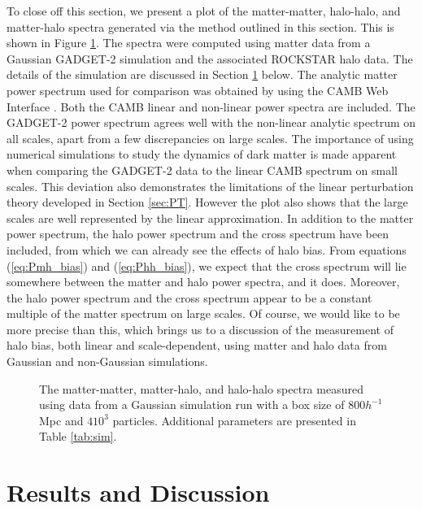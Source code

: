 \documentclass[10pt,letterpaper,final]{iopart}
\numberwithin{equation}{subsection}
\begin{document}
 
To close off this section, we present a plot of the matter-matter, halo-halo, and matter-halo spectra generated via the method outlined in this section. This is shown in Figure \ref{PSplot}. The spectra were computed using matter data from a Gaussian GADGET-2 simulation and the associated ROCKSTAR halo data. The details of the simulation are discussed in Section \ref{sec:results} below. The analytic matter power spectrum used for comparison was obtained by using the CAMB Web Interface \cite{CAMBweb}\cite{CAMBnotes}. Both the CAMB linear and non-linear power spectra are included. The GADGET-2 power spectrum agrees well with the non-linear analytic spectrum on all scales, apart from a few discrepancies on large scales. The importance of using numerical simulations to study the dynamics of dark matter is made apparent when comparing the GADGET-2 data to the linear CAMB spectrum on small scales. This deviation also demonstrates the limitations of the linear perturbation theory developed in Section \ref{sec:PT}. However the plot also shows that the large scales are well represented by the linear approximation. In addition to the matter power spectrum, the halo power spectrum and the cross spectrum have been included, from which we can already see the effects of halo bias. From equations (\ref{eq:Pmh_bias}) and (\ref{eq:Phh_bias}), we expect that the cross spectrum will lie somewhere between the matter and halo power spectra, and it does. Moreover, the halo power spectrum and the cross spectrum appear to be a constant multiple of the matter spectrum on large scales. Of course, we would like to be more precise than this, which brings us to a discussion of the measurement of halo bias, both linear and scale-dependent, using matter and halo data from Gaussian and non-Gaussian simulations.


\begin{figure}[h!]
\begin{center}
\caption{The matter-matter, matter-halo, and halo-halo spectra measured using data from a Gaussian simulation run with a box size of $800 h^{-1}$ Mpc and $410^3$ particles. Additional parameters are presented in Table \ref{tab:sim}.}
\label{PSplot}
\end{center}
\end{figure}

%


\section{Results and Discussion}\label{sec:results}
\end{document}

